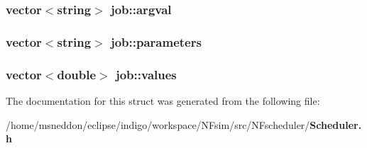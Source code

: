 \subsubsection{\setlength{\rightskip}{0pt plus 5cm}vector$<$string$>$ {\bf job::argval}}\label{structjob_1172cbabdb3950cb2360886dc26f4b43}


\subsubsection{\setlength{\rightskip}{0pt plus 5cm}vector$<$string$>$ {\bf job::parameters}}\label{structjob_7fd43ef19b9dce37cfa4c2f8be1ea7b4}


\subsubsection{\setlength{\rightskip}{0pt plus 5cm}vector$<$double$>$ {\bf job::values}}\label{structjob_b4c342e85c9ed6a16654f7d78ebb1b9a}




The documentation for this struct was generated from the following file:\begin{CompactItemize}
\item 
/home/msneddon/eclipse/indigo/workspace/NFsim/src/NFscheduler/{\bf Scheduler.h}\end{CompactItemize}
